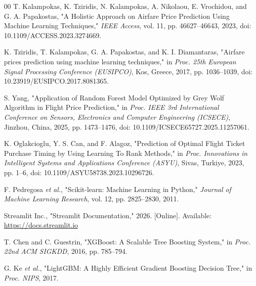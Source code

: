 \documentclass[conference]{IEEEtran}
\begin{document}
\begin{thebibliography}{00}
T. Kalampokas, K. Tziridis, N. Kalampokas, A. Nikolaou, E. Vrochidou, and G. A. Papakostas, "A Holistic Approach on Airfare Price Prediction Using Machine Learning Techniques," \textit{IEEE Access}, vol. 11, pp. 46627--46643, 2023, doi: 10.1109/ACCESS.2023.3274669.

K. Tziridis, T. Kalampokas, G. A. Papakostas, and K. I. Diamantaras, "Airfare prices prediction using machine learning techniques," in \textit{Proc. 25th European Signal Processing Conference (EUSIPCO)}, Kos, Greece, 2017, pp. 1036--1039, doi: 10.23919/EUSIPCO.2017.8081365.

S. Yang, "Application of Random Forest Model Optimized by Grey Wolf Algorithm in Flight Price Prediction," in \textit{Proc. IEEE 3rd International Conference on Sensors, Electronics and Computer Engineering (ICSECE)}, Jinzhou, China, 2025, pp. 1473--1476, doi: 10.1109/ICSECE65727.2025.11257061.

K. Oglakcioglu, Y. S. Can, and F. Alagoz, "Prediction of Optimal Flight Ticket Purchase Timing by Using Learning To Rank Methods," in \textit{Proc. Innovations in Intelligent Systems and Applications Conference (ASYU)}, Sivas, Turkiye, 2023, pp. 1--6, doi: 10.1109/ASYU58738.2023.10296726.

F. Pedregosa \textit{et al.}, "Scikit-learn: Machine Learning in Python," \textit{Journal of Machine Learning Research}, vol. 12, pp. 2825--2830, 2011.

Streamlit Inc., "Streamlit Documentation," 2026. [Online]. Available: \url{https://docs.streamlit.io}

T. Chen and C. Guestrin, "XGBoost: A Scalable Tree Boosting System," in \textit{Proc. 22nd ACM SIGKDD}, 2016, pp. 785--794.

G. Ke \textit{et al.}, "LightGBM: A Highly Efficient Gradient Boosting Decision Tree," in \textit{Proc. NIPS}, 2017.
\end{thebibliography}
\end{document}
